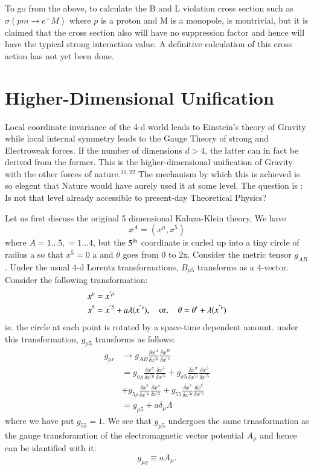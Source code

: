 To go from the above, to calculate the B and L violation cross section such as $\sigma (p  m \rightarrow e^{+} M)$ where $p$ is a proton and M is a monopole, is montrivial, but it is claimed that the cross section also will have no suppression factor and hence will have the typical strong interaction value. A definitive calculation of this cross action has not yet been done.

\section{Higher-Dimensional Unification}

Local coordinate invariance of the 4-d world leads to Einstein's theory of Gravity while local internal symmetry leads to the Gauge Theory of strong and Electroweak forces. If the number of dimensions $d > 4$, the latter can in fact be derived from the former. This is the higher-dimensional unification of Gravity with the other forces of nature.$^{21, 22}$ The mechanism by which this is achieved is so elegent that Nature would have aurely used it at some level. The question is : Is not that level already accessible to present-day Theoretical Physics?

Let us first discuss the original 5 dimensional Kaluza-Klein theory, We have
$$
x^{A} = (x^{\mu}, x^{5})
$$ 
where $A = 1 \ldots 5, = 1 \ldots 4$, but the $5^{\rm th}$ coordinate is curled up into a tiny circle of radius a so that $x^{5}=0$ a and $\theta$ goes from 0 to 2x. Consider the metric tensor $g_{AB}$. Under the usual 4-d Lorentz transformations, $B_{\mu 5}$ transforms as a 4-vector. Consider the following transformation:
\begin{align*}
x^{\mu} &= x^{'\mu}\\
x^{5} & = x^{' 5} + a\lambda(x^{'v}), \quad {\rm or},\quad \theta = \theta' + \lambda(x^{'v})\\ 
\end{align*}
ie. the circle at each point is rotated by a space-time dependent amount. under this transformation, $g_{\mu 5}$ transforms as follows:
\begin{align*}
g_{\mu r} &\rightarrow g_{AB} \frac{\delta x^{A}}{\delta x^{'\mu}} \frac{\delta x^{B}}{\delta x^{'5}}\\
          &= g_{\sigma \rho} \frac{\delta x^{\sigma}}{\delta x^{' \mu}} \frac{\delta x^{5}}{\delta x^{'5}} + g_{\sigma 5} \frac{\delta x^{\sigma}}{\delta x^{' \mu}} \frac{\delta x^{5}}{\delta x^{' 5}}\\
          & + g_{5 \rho} \frac{\delta x^{5}}{\delta x^{' \mu}} \frac{\delta x^{\rho}}{\delta x^{' 5}} + g_{55} \frac{\delta x^{5}}{\delta x^{' \mu}} \frac{\delta x^{5}}{\delta x^{'5}}\\
          &= g_{\mu 5 } + a \delta_{\mu} \Lambda
\end{align*}
where we have put $g_{55}= 1$. We see that $g_{\mu 5}$ undergoes the same trnasformation as the gauge transforamtion of the electromagnetic vector potential $A_{\mu}$ and hence can be idantified with it:
$$
g_{\mu g} \equiv a A_{\mu}.
$$

